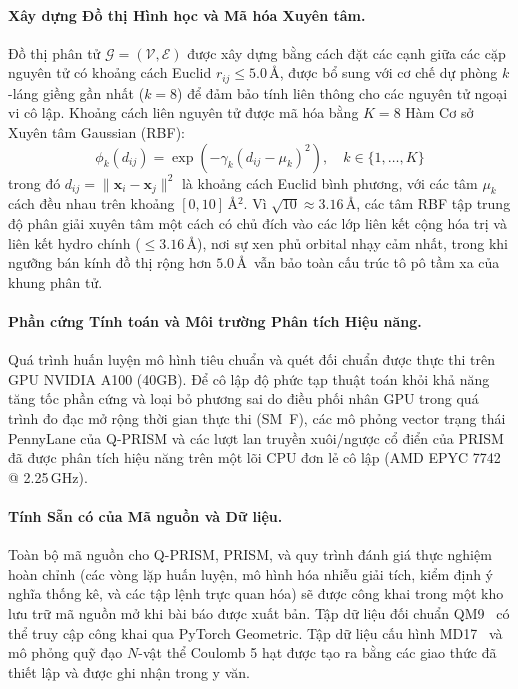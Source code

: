 \documentclass[10pt,twocolumn,letterpaper]{article}
\begin{document}
\paragraph{Xây dựng Đồ thị Hình học và Mã hóa Xuyên tâm.}
Đồ thị phân tử $\mathcal{G} = (\mathcal{V}, \mathcal{E})$ được xây dựng bằng cách đặt các cạnh giữa các cặp nguyên tử có khoảng cách Euclid $r_{ij} \le 5.0$\,\AA, được bổ sung với cơ chế dự phòng $k$-láng giềng gần nhất ($k = 8$) để đảm bảo tính liên thông cho các nguyên tử ngoại vi cô lập. Khoảng cách liên nguyên tử được mã hóa bằng $K = 8$ Hàm Cơ sở Xuyên tâm Gaussian (RBF):
\begin{equation}
    \phi_k(d_{ij}) = \exp\left(-\gamma_k (d_{ij} - \mu_k)^2\right), \quad k \in \{1, \dots, K\}
\end{equation}
trong đó $d_{ij} = \|\mathbf{x}_i - \mathbf{x}_j\|^2$ là khoảng cách Euclid bình phương, với các tâm $\mu_k$ cách đều nhau trên khoảng $[0, 10]$\,\AA$^2$. Vì $\sqrt{10} \approx 3.16$\,\AA, các tâm RBF tập trung độ phân giải xuyên tâm một cách có chủ đích vào các lớp liên kết cộng hóa trị và liên kết hydro chính ($\le 3.16$\,\AA), nơi sự xen phủ orbital nhạy cảm nhất, trong khi ngưỡng bán kính đồ thị rộng hơn $5.0$\,\AA\ vẫn bảo toàn cấu trúc tô pô tầm xa của khung phân tử.

\paragraph{Phần cứng Tính toán và Môi trường Phân tích Hiệu năng.}
Quá trình huấn luyện mô hình tiêu chuẩn và quét đối chuẩn được thực thi trên GPU NVIDIA A100 (40GB). Để cô lập độ phức tạp thuật toán khỏi khả năng tăng tốc phần cứng và loại bỏ phương sai do điều phối nhân GPU trong quá trình đo đạc mở rộng thời gian thực thi (SM~F), các mô phỏng vector trạng thái PennyLane của Q-PRISM và các lượt lan truyền xuôi/ngược cổ điển của PRISM đã được phân tích hiệu năng trên một lõi CPU đơn lẻ cô lập (AMD EPYC 7742 @ 2.25\,GHz).

\paragraph{Tính Sẵn có của Mã nguồn và Dữ liệu.}
Toàn bộ mã nguồn cho Q-PRISM, PRISM, và quy trình đánh giá thực nghiệm hoàn chỉnh (các vòng lặp huấn luyện, mô hình hóa nhiễu giải tích, kiểm định ý nghĩa thống kê, và các tập lệnh trực quan hóa) sẽ được công khai trong một kho lưu trữ mã nguồn mở khi bài báo được xuất bản. Tập dữ liệu đối chuẩn QM9~\cite{ramakrishnan2014quantum} có thể truy cập công khai qua PyTorch Geometric. Tập dữ liệu cấu hình MD17~\cite{chmielaMachineLearningAccurate2016} và mô phỏng quỹ đạo $N$-vật thể Coulomb 5 hạt được tạo ra bằng các giao thức đã thiết lập và được ghi nhận trong y văn.
\end{document}

